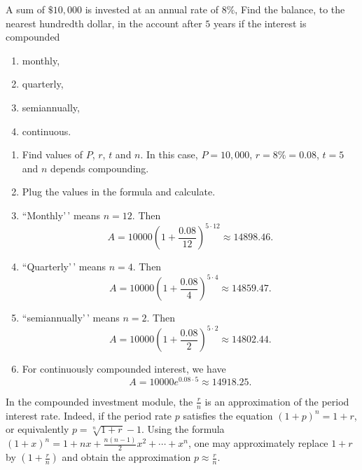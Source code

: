 \documentclass[
  en,11pt]{elegantbook}
\providecommand{\tightlist}{%
  \setlength{\itemsep}{0pt}\setlength{\parskip}{0pt}}
\newcommand{\size}[2]{{\fontsize{#1}{0}\selectfont#2}}
\renewenvironment{example}[1][]{
  \refstepcounter{exam}
  \par\noindent\textbf{\color{main}{\examplename} \theexam #1}
  \rmfamily
}{
  \par\ignorespacesafterend
}
\newenvironment{rmdnote}{
	\vspace*{0.5\baselineskip}
    \par\noindent
    \makebox[-3pt][r]{\color{red!90}\size{8}{\textdbend}\,\,}
    \begin{tcolorbox}[
    title={\textbf{\color{second}Note}},
    title style={left color=blue!10!green!20!white,right color=yellow!20!blue!20!white},
    colback=red!10!white,
    ]
    \itshape
}{
    \end{tcolorbox}
    \par\ignorespacesafterend
}
\begin{document}
\begin{example}

A sum of \(\$10,000\) is invested at an annual rate of \(8\%\), Find the balance, to the nearest hundredth dollar, in the account after \(5\) years if the interest is compounded

\begin{enumerate}
\def\labelenumi{\arabic{enumi}.}
\tightlist
\item
  monthly,
\item
  quarterly,
\item
  semiannually,
\item
  continuous.
\end{enumerate}

\end{example}

\begin{solution}



\begin{enumerate}
\def\labelenumi{\arabic{enumi}.}
\tightlist
\item
  Find values of \(P\), \(r\), \(t\) and \(n\). In this case, \(P=10,000\), \(r=8\%=0.08\), \(t=5\) and \(n\) depends compounding.
\item
  Plug the values in the formula and calculate.
\item
  ``Monthly'\,' means \(n=12\). Then
  \[
   A=10000\left(1+\frac{0.08}{12}\right)^{5\cdot 12}\approx 14898.46.
   \]
\item
  ``Quarterly'\,' means \(n=4\). Then
  \[
   A=10000\left(1+\frac{0.08}{4}\right)^{5\cdot 4}\approx 14859.47.
   \]
\item
  ``semiannually'\,' means \(n=2\). Then
  \[
   A=10000\left(1+\frac{0.08}{2}\right)^{5\cdot 2}\approx 14802.44.
   \]
\item
  For continuously compounded interest, we have
  \[
   A=10000e^{0.08\cdot 5}\approx 14918.25.
   \]
\end{enumerate}

\end{solution}

\begin{rmdnote}

In the compounded investment module, the \(\frac rn\) is an approximation of the period interest rate. Indeed, if the period rate \(p\) satisfies the equation \((1+p)^n=1+r\), or equivalently \(p=\sqrt[n]{1+r} - 1\). Using the formula \((1+x)^n=1+nx+\frac{n(n-1)}{2}x^2+\cdots +x^n\), one may approximately replace \(1+r\) by \((1+\frac rn)\) and obtain the approximation \(p\approx \frac rn\).

\end{rmdnote}
\end{document}
